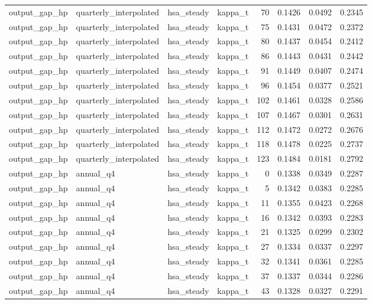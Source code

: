 \begin{tabular}{llllrrrr}
output\_gap\_hp & quarterly\_interpolated & hsa\_steady & kappa\_t & 70 & 0.1426 & 0.0492 & 0.2345 \\
output\_gap\_hp & quarterly\_interpolated & hsa\_steady & kappa\_t & 75 & 0.1431 & 0.0472 & 0.2372 \\
output\_gap\_hp & quarterly\_interpolated & hsa\_steady & kappa\_t & 80 & 0.1437 & 0.0454 & 0.2412 \\
output\_gap\_hp & quarterly\_interpolated & hsa\_steady & kappa\_t & 86 & 0.1443 & 0.0431 & 0.2442 \\
output\_gap\_hp & quarterly\_interpolated & hsa\_steady & kappa\_t & 91 & 0.1449 & 0.0407 & 0.2474 \\
output\_gap\_hp & quarterly\_interpolated & hsa\_steady & kappa\_t & 96 & 0.1454 & 0.0377 & 0.2521 \\
output\_gap\_hp & quarterly\_interpolated & hsa\_steady & kappa\_t & 102 & 0.1461 & 0.0328 & 0.2586 \\
output\_gap\_hp & quarterly\_interpolated & hsa\_steady & kappa\_t & 107 & 0.1467 & 0.0301 & 0.2631 \\
output\_gap\_hp & quarterly\_interpolated & hsa\_steady & kappa\_t & 112 & 0.1472 & 0.0272 & 0.2676 \\
output\_gap\_hp & quarterly\_interpolated & hsa\_steady & kappa\_t & 118 & 0.1478 & 0.0225 & 0.2737 \\
output\_gap\_hp & quarterly\_interpolated & hsa\_steady & kappa\_t & 123 & 0.1484 & 0.0181 & 0.2792 \\
output\_gap\_hp & annual\_q4 & hsa\_steady & kappa\_t & 0 & 0.1338 & 0.0349 & 0.2287 \\
output\_gap\_hp & annual\_q4 & hsa\_steady & kappa\_t & 5 & 0.1342 & 0.0383 & 0.2285 \\
output\_gap\_hp & annual\_q4 & hsa\_steady & kappa\_t & 11 & 0.1355 & 0.0423 & 0.2268 \\
output\_gap\_hp & annual\_q4 & hsa\_steady & kappa\_t & 16 & 0.1342 & 0.0393 & 0.2283 \\
output\_gap\_hp & annual\_q4 & hsa\_steady & kappa\_t & 21 & 0.1325 & 0.0299 & 0.2302 \\
output\_gap\_hp & annual\_q4 & hsa\_steady & kappa\_t & 27 & 0.1334 & 0.0337 & 0.2297 \\
output\_gap\_hp & annual\_q4 & hsa\_steady & kappa\_t & 32 & 0.1341 & 0.0361 & 0.2285 \\
output\_gap\_hp & annual\_q4 & hsa\_steady & kappa\_t & 37 & 0.1337 & 0.0344 & 0.2286 \\
output\_gap\_hp & annual\_q4 & hsa\_steady & kappa\_t & 43 & 0.1328 & 0.0327 & 0.2291 \\

\end{tabular}
